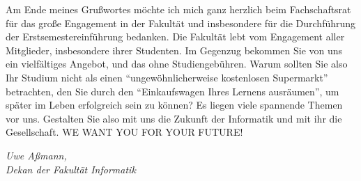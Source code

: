 {Am Ende meines Grußwortes möchte ich mich ganz herzlich beim Fachschaftsrat für das große Engagement in der Fakultät und insbesondere für die Durchführung der Erstsemestereinführung bedanken. Die Fakultät lebt vom Engagement aller Mitglieder, insbesondere ihrer Studenten. Im Gegenzug bekommen Sie von uns ein vielfältiges Angebot, und das ohne Studiengebühren. Warum sollten Sie also Ihr Studium nicht als einen \enquote{ungewöhnlicherweise kostenlosen Supermarkt} betrachten, den Sie durch den \enquote{Einkaufswagen Ihres Lernens ausräumen}, um später im Leben erfolgreich sein zu können? Es liegen viele spannende Themen vor uns. Gestalten Sie also mit uns die Zukunft der Informatik und mit ihr die Gesellschaft. WE WANT YOU FOR YOUR FUTURE\@!

\textit{Uwe Aßmann,\\
Dekan der Fakultät Informatik}

}

